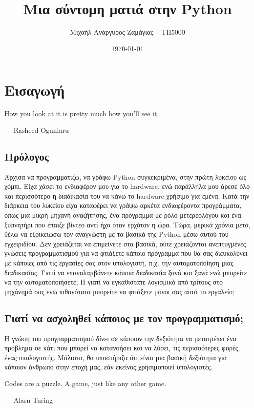 \documentclass[14pt]{extreport}
\title{Μια σύντομη ματιά στην Python}
\author{Μιχαήλ Ανάργυρος Ζαμάγιας -- ΤΠ5000}
\date{\today}
\begin{document}
\maketitle

\tableofcontents
\newpage

\chapter{Εισαγωγή}

\epigraph{How you look at it is pretty much how you'll see it.}{--- Rasheed Ogunlaru}

\newpage

\section{Πρόλογος}

Άρχισα να προγραμματίζω, να γράφω Python συγκεκριμένα, στην πρώτη λυκείου ως χόμπι. Είχα χάσει το ενδιαφέρον μου για το hardware, ενώ παράλληλα μου άρεσε όλο και περισσότερο η διαδικασία του να κάνω το hardware χρήσιμο για εμένα. Κατά την διάρκεια του λυκείου είχα καταφέρει να γράψω αρκέτα ενδιαφέροντα προγράμματα, όπως μια μικρή μηχανή αναζήτησης, ένα πρόγραμμα με ρόλο μετερεολόγου και ένα ξυπνητήρι που έπαιζε βίντεο αντί ήχο όταν ερχόταν η ώρα. Τώρα, μερικά χρόνια μετά, θέλω να εξοικειώσω τον αναγνώστη με τα βασικά της Python μέσω αυτού του εγχειριδίου. Δεν χρειάζεται να επιμείνετε στα βασικά, ούτε χρειάζονται ανεπτυγμένες γνώσεις προγραμματισμού για να φτιάξετε κάποιο πρόγραμμα που θα σας διευκολύνει με κάποιες από τις εργασίες σας στον υπολογιστή, π.χ. την αυτοματοποίηση μιας διαδικασίας. Γιατί να επαναλαμβάνετε κάποια διαδικασία ξανά και ξανά ενώ μπορείτε να την αυτοματοποιήσετε; Η γιατί να εγκαθιστάτε λογισμικό από τρίτους στο μηχάνημά σας ενώ πιθανότατα μπορείτε να φτιάξετε μόνοι σας αυτό το εργαλείο;

\section{Γιατί να ασχοληθεί κάποιος με τον προγραμματισμό;}

Η γνώση του προγραμματισμού δίνει σε κάποιον την δεξιότητα να μετατρέπει ένα πρόβλημα σε κάτι που μπορεί να κατανοήσει και να λύσει, τις περισσότερες φορές, ένας υπολογιστής. Μάλιστα, θα υποστήριζα ότι είναι μια βασική δεξιότητα για κάποιον άνθρωπο στην εποχή μας, εάν εκείνος χρησιμοποιεί υπολογιστές.

\epigraph{Codes are a puzzle. A game, just like any other game.}{--- Alarn Turing}
\end{document}
